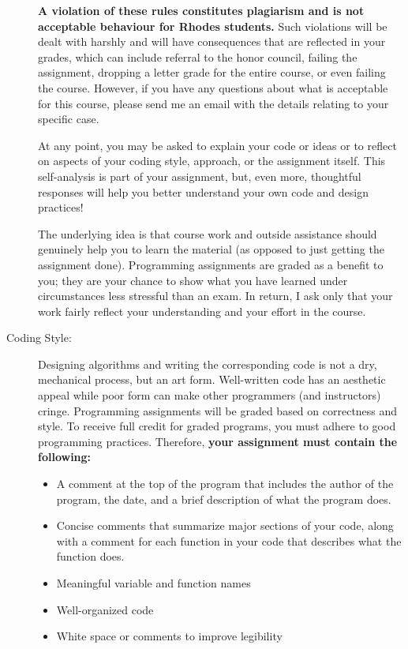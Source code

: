 \documentclass [letterpaper,11pt]{article}
\begin{document}
\begin{description}
\textbf{A violation of these rules constitutes plagiarism and is not acceptable behaviour for Rhodes
students.} Such violations will be dealt with harshly and will have consequences that are
reflected in your grades, which can include referral to the honor council, failing the assignment, dropping a letter grade for
the entire course, or even failing the course.  However, if you have any questions about what
is acceptable for this course, please send me an email with the details relating to your specific
case.

At any point, you may be asked to explain your code or ideas or to reflect on aspects of your
coding style, approach, or the assignment itself. This self-analysis is part of your assignment,
but, even more, thoughtful responses will help you better understand your own code and
design practices!

The underlying idea is that course work and outside assistance should genuinely help you to
learn the material (as opposed to just getting the assignment done). Programming assignments
are graded as a benefit to you; they are your chance to show what you have learned
under circumstances less stressful than an exam. In return, I ask only that your work fairly
reflect your understanding and your effort in the course.

\item[Coding Style:]
Designing algorithms and writing the corresponding code is not a dry, mechanical process, but an art form.  Well-written code has an aesthetic appeal while poor form can make other programmers (and instructors) cringe. Programming assignments will be graded based on correctness and style. To receive full credit for graded programs, you must adhere to good programming practices. Therefore, \textbf{your assignment must contain the following:}
\begin{itemize}\setlength{\itemsep}{0em}\setlength{\parskip}{0pt}
	\item A comment at the top of the program that includes the author of the program,
	the date, and a brief description of what the program does.
	\item Concise comments that summarize major sections of your code, along with a comment
	for each function in your code that describes what the function does.
	\item Meaningful variable and function names
	\item Well-organized code
	\item White space or comments to improve legibility
\end{itemize}


\end{description}
\end{document}
